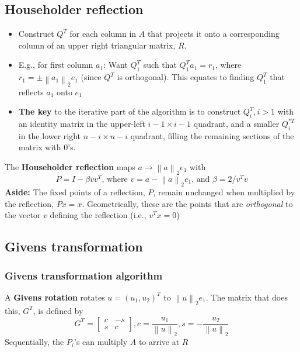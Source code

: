 \documentclass{article}
\newcommand{\norm}[2]{\left\lVert#1\right\rVert_#2}
\begin{document}
\subsection{Householder reflection}
\begin{itemize}
    \item Construct $Q^T$ for each column in $A$ that projects it onto a corresponding column of an upper right triangular matrix, $R$.
    \item E.g., for first column $a_1$: Want $Q_1^T$ such that $Q_1^Ta_1 = r_1$, where $r_1 = \pm \norm{a_1}{2}e_1$ (since $Q^T$ is orthogonal). This equates to finding $Q_1^T$ that reflects $a_1$ onto $e_1$
    \item \textbf{The key} to the iterative part of the algorithm is to construct $Q_i^T, i > 1$ with an identity matrix in the upper-left $i-1 \times i-1$ quadrant, and a smaller $Q_i^{*T}$ in the lower right $n-i \times n-i$ quadrant, filling the remaining sections of the matrix with $0$'s.
\end{itemize}
\noindent The \textbf{Householder reflection} maps $a \rightarrow \norm{a}{2}e_1$ with
\begin{equation*}
    P = I - \beta vv^T \textrm{, where $v = a - \norm{a}{2}e_1$, and $\beta = 2/v^Tv$}
\end{equation*}
\textbf{Aside:} The fixed points of a reflection, $P$, remain unchanged when multiplied by the reflection, $Px=x$. Geometrically, these are the points that are \textit{orthogonal} to the vector $v$ defining the reflection (i.e., $v^Tx=0$)


\subsection{Givens transformation}
\subsubsection{Givens transformation algorithm}
A \textbf{Givens rotation} rotates $u = (u_1, u_2)^T$ to $\norm{u}{2}e_1$. The matrix that does this, $G^T$, is defined by
\begin{equation*}
    G^T = \begin{bmatrix} c & -s \\ s & c \end{bmatrix}, c = \frac{u_1}{\norm{u}{2}}, s = -\frac{u_2}{\norm{u}{2}}
\end{equation*}
Sequentially, the $P_i$'s can multiply $A$ to arrive at $R$
\end{document}
